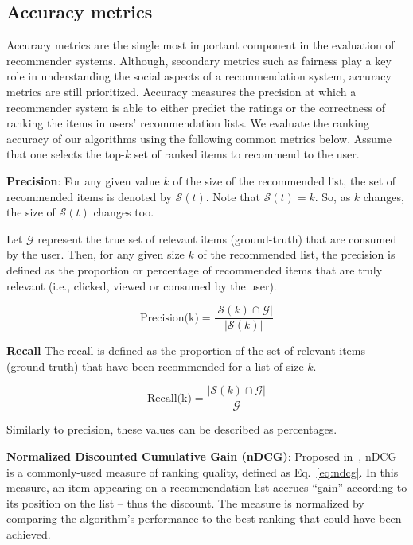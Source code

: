     
    \subsection{Accuracy metrics}
    
    Accuracy metrics are the single most important component in the evaluation of recommender systems. Although, secondary metrics such as fairness play a key role in understanding the social aspects of a recommendation system, accuracy metrics are still prioritized. Accuracy measures the precision at which a recommender system is able to either predict the ratings or the correctness of ranking the items in users' recommendation lists. We evaluate the ranking accuracy of our algorithms using the following common metrics below. Assume that one selects the top-$k$ set of ranked items to recommend to the user.
    
        \textbf{Precision}: For any given value $k$ of the size of the recommended list, the set of recommended items is denoted by $\mathcal{S}(t)$. Note that $\mathcal{S}(t)=k$. So, as $k$ changes, the size of $\mathcal{S}(t)$ changes too.
        
        Let $\mathcal{G}$ represent the true set of relevant items (ground-truth) that are consumed by the user. Then, for any given size $k$ of the recommended list, the precision is defined as the proportion or percentage of recommended items that are truly relevant (i.e., clicked, viewed or consumed by the user). 
        
        \begin{equation}
        \text{Precision(k)}=\frac{|\mathcal{S}(k) \displaystyle \cap \mathcal{G}|}{|\mathcal{S}(k)|}
        \label{eq:precision}
        \end{equation}
        
        
        \textbf{Recall}
        The recall is defined as the proportion of the set of relevant items (ground-truth) that have been recommended for a list of size $k$.
        
        \begin{equation}
        \text{Recall(k)}=\frac{|\mathcal{S}(k) \displaystyle \cap \mathcal{G}|}{\mathcal{G}}
        \label{eq:recall}
        \end{equation}
        
        Similarly to precision, these values can be described as percentages.
        
        \textbf{Normalized Discounted Cumulative Gain (nDCG)}: Proposed in~\cite{jarvelin2002cumulated}, nDCG is a commonly-used measure of ranking quality, defined as Eq.~\eqref{eq:ndcg}. In this measure, an item appearing on a recommendation list accrues ``gain'' according to its position on the list -- thus the discount. The measure is normalized by comparing the algorithm's performance to the best ranking that could have been achieved. 

